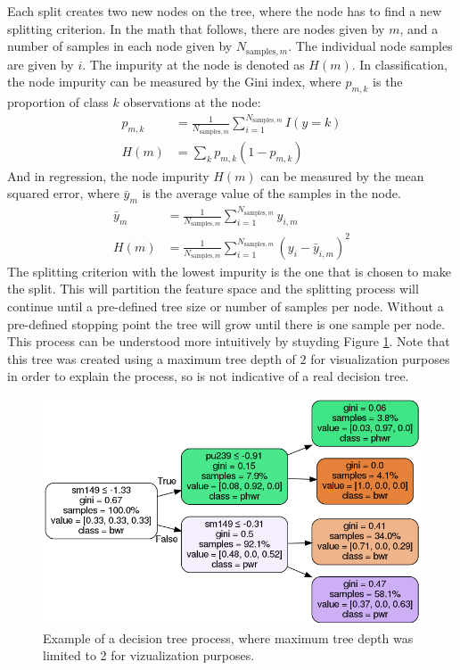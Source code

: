 Each split creates two new nodes on the tree, where the node has to find a new
splitting criterion. In the math that follows, there are nodes given by $m$,
and a number of samples in each node given by $N_{\text{samples}, m}$. The
individual node samples are given by $i$. The impurity at the node is denoted
as $H(m)$. In classification, the node impurity can be measured by the Gini
index, where $p_{m, k}$ is the proportion of class $k$ observations at the
node:
\begin{equation}
  \begin{aligned}
    p_{m, k} &= \frac{1}{N_{\text{samples}, m}} \sum_{i=1}^{N_{\text{samples}, m}}
              I(y = k)
    \\
    H(m) &= \sum_k p_{m, k} (1 - p_{m, k})
  \end{aligned}
\end{equation}
And in regression, the node impurity $H(m)$ can be measured by the mean squared
error, where $\bar{y}_m$ is the average value of the samples in the node.
\begin{equation}
  \begin{aligned}
    \bar{y}_m &= \frac{1}{N_{\text{samples}, m}} \sum_{i=1}^{N_{\text{samples}, m}} 
                 y_{i, m}
    \\
    H(m) &= \frac{1}{N_{\text{samples}, m}} \sum_{i=1}^{N_{\text{samples}, m}}
              (y_i - \bar{y}_{i, m})^2
  \end{aligned}
\end{equation}
The splitting criterion with the lowest impurity is the one that is chosen to
make the split.  This will partition the feature space and the splitting
process will continue until a pre-defined tree size or number of samples per
node. Without a pre-defined stopping point the tree will grow until there is
one sample per node. This process can be understood more intuitively by
stuyding Figure \ref{fig:dtr}. Note that this tree was created using a maximum
tree depth of $2$ for visualization purposes in order to explain the process,
so is not indicative of a real decision tree.

\begin{figure}[!htb]
  \centering
  \includegraphics[width=\linewidth]{./chapters/litrev/dtree.png}
  \caption{Example of a decision tree process, where maximum tree depth was 
           limited to 2 for vizualization purposes.}
  \label{fig:dtr}
\end{figure}

